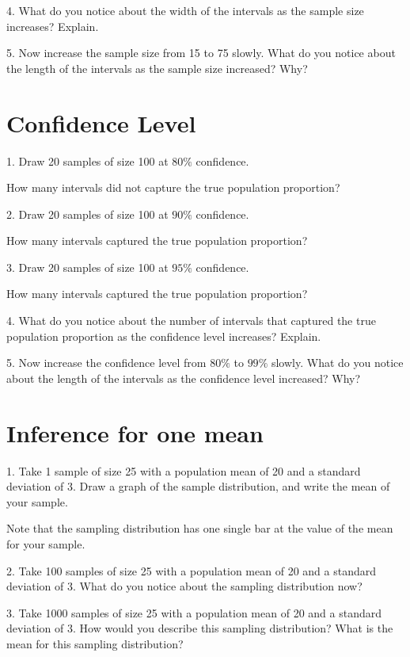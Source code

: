 \documentclass[11pt]{amsart}
\begin{document}
4. What do you notice about the width of the intervals as the sample size increases? Explain.

5. Now increase the sample size from 15 to 75 slowly. What do you notice about the length of the intervals as the sample size increased? Why?







\section{Confidence Level}
1. Draw 20 samples of size 100 at $80\%$ confidence.


 
 How many intervals did not capture the true population proportion?
 
 2. Draw 20 samples of size 100 at $90\%$ confidence.


 
 How many intervals captured the true population proportion?
 
 3. Draw 20 samples of size 100 at $95\%$ confidence.


 How many intervals captured the true population proportion?


4. What do you notice about the number of intervals that captured the true population proportion as the confidence level increases? Explain.

5. Now increase the confidence level from $80\%$ to $99\%$ slowly. What do you notice about the length of the intervals as the confidence level increased? Why?




\section{Inference for one mean}

1.  Take 1 sample of size 25 with a population mean of 20 and a standard deviation of 3. Draw a graph of the sample distribution, and write the mean of your sample.


Note that the sampling distribution has one single bar at the value of the mean for your sample.

2.  Take 100 samples of size 25 with a population mean of 20 and a standard deviation of 3.  What do you notice about the sampling distribution now?

3. Take 1000 samples of size 25 with a population mean of 20 and a standard deviation of 3.  How would you describe this sampling distribution? What is the mean for this sampling distribution?
\end{document}
